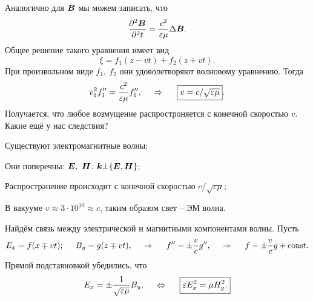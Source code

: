 Аналогично для $\mbox{\boldmath $B$}$ мы можем записать, что
\begin{equation*}
    \frac{\partial^2 \mbox{\boldmath $B$}}{\partial^2 t}  = \frac{c^2}{\varepsilon \mu}  \Delta \mbox{\boldmath $B$}.
\end{equation*}
Общее решение такого уравнения имеет вид
\begin{equation*}
    \xi = f_1(z-vt) + f_2 (z+vt).
\end{equation*}
При произвольном виде $f_1, \ f_2$ они удоволетворяют волновому уравнению. Тогда
\begin{equation*}
    v_1^2 f_1'' = \frac{c^2}{\varepsilon \mu} f_1'',
    \hspace{0.5cm} \Rightarrow \hspace{0.5cm} 
    \boxed{
        v = c / \sqrt{\varepsilon \mu}   
    }.
\end{equation*}
Получается, что любое возмущение распростроняется с конечной скоростью $v$. Какие ещё у нас следствия?
\begin{enumerate*}
    \item Существуют электромагнитные волны;
    \item Они поперечны: $\mbox{\boldmath $E$}, \ \mbox{\boldmath $H$} \colon \mbox{\boldmath $k$} \bot \{\mbox{\boldmath $E$}, \mbox{\boldmath $H$}\}$;
    \item Распространение происходит с конечной скоростью $c / \sqrt{\varepsilon \mu}$;
    \item В вакууме $v  \approx 3 \cdot 10^{10} \approx c$, таким образом свет -- ЭМ волна.
\end{enumerate*}

Найдём связь между электрической и магнитными компонентами волны. Пусть
\begin{equation*}
    E_x = f(x \mp v t); \hspace{0.5cm} 
    B_y = g(z \mp vt),
    \hspace{0.5cm} \Rightarrow \hspace{0.5cm} 
    f'' = \pm \frac{v}{c} g'',
    \hspace{0.5cm} \Rightarrow \hspace{0.5cm} 
    f = \pm \frac{v}{c} g + \text{const}.
\end{equation*}
Прямой подставновкой убедились, что
\begin{equation*}
    E_x = \pm \frac{1}{\sqrt{\varepsilon\mu}} B_y, \hspace{0.5cm} \Leftrightarrow 
    \hspace{0.5cm} 
    \boxed{
        \varepsilon E_x^2 = \mu H_y^2.   
    }
\end{equation*}

